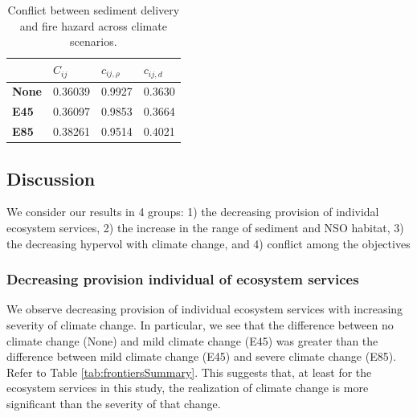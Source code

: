 \begin{table}[]
\centering
\caption[Sediment delivery-fire hazard conflict across climate scenarios]{Conflict between sediment delivery and fire hazard across climate scenarios.}
\label{tab:pairConflict-SedFire}
\begin{tabular}{l|l|ll}
\textbf{}     & \textbf{$C_{ij}$} & \textbf{$c_{ij,\rho}$} & \textbf{$c_{ij,d}$} \\ \hline
\textbf{None} & 0.36039           & 0.9927                 & 0.3630              \\
\textbf{E45}  & 0.36097           & 0.9853                 & 0.3664              \\
\textbf{E85}  & 0.38261           & 0.9514                 & 0.4021
\end{tabular}
\end{table}

\subsection{Discussion}
We consider our results in 4 groups: 1) the decreasing provision of individal ecosystem services, 2) the increase in the range of sediment and NSO habitat, 3) the decreasing hypervol with climate change, and 4) conflict among the objectives
\subsubsection{Decreasing provision individual of ecosystem services}
We observe decreasing provision of individual ecosystem services with increasing severity of climate change. In particular, we see that the difference between no climate change (None) and mild climate change (E45) was greater than the difference between mild climate change (E45) and severe climate change (E85). Refer to Table \ref{tab:frontiersSummary}. This suggests that, at least for the ecosystem services in this study, the realization of climate change is more significant than the severity of that change.

